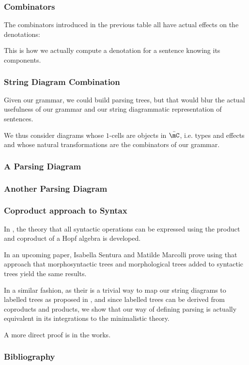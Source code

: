 \documentclass[math, english, info, noamsthm]{beamercours}
\begin{document}
\begin{frame}
	\frametitle{Combinators}
	The combinators introduced in the previous table all have actual effects on the denotations:
	\begin{center}
		\scriptsize
		
	\end{center}
	This is how we actually compute a denotation for a sentence knowing its components.
\end{frame}

\begin{frame}
	\frametitle{String Diagram Combination}
	Given our grammar, we could build parsing trees, but that would blur the actual usefulness of our grammar and our string diagrammatic representation of sentences.

	\medskip

	We thus consider diagrams whose $1$-cells are objects in $\bar{\mC}$, i.e. types and effects and whose natural transformations are the combinators of our grammar.
\end{frame}

\begin{frame}
	\frametitle{A Parsing Diagram}
	\begin{center}
	\end{center}
\end{frame}

\begin{frame}
	\frametitle{Another Parsing Diagram}
	\begin{center}
	\end{center}
\end{frame}

\begin{frame}
	\frametitle{Coproduct approach to Syntax}
	In \cite{marcollimatildeetchomskynoametberwickrobertc.MathematicalStructureSyntactic},
	the theory that all syntactic operations can be expressed using the product and coproduct of a
	Hopf algebra is developed.

	\smallskip

	In an upcoming paper, Isabella Sentura and Matilde Marcolli prove using
	that approach that morphosyntactic trees and morphological trees added to
	syntactic trees yield the same results.

	In a similar fashion, as their is a trivial way to map our string diagrams
	to labelled trees as proposed in \cite{bumfordEffectdrivenInterpretationFunctors2025},
	and since labelled trees can be derived from coproducts and products, we
	show that our way of defining parsing is actually equivalent in its
	integrations to the minimalistic theory.

	\medskip

	A more direct proof is in the works.
\end{frame}

\appendix
\begin{frame}[allowframebreaks]
	\frametitle{Bibliography}
	\printbibliography{}
\end{frame}
\end{document}
